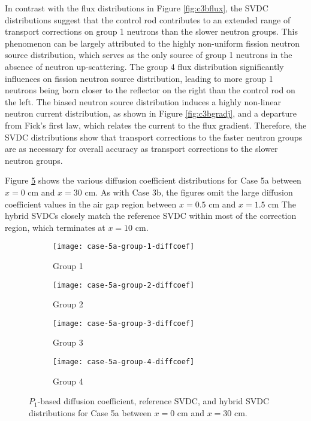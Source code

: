In contrast with the flux distributions in Figure \ref{fig:c3bflux}, the \gls{SVDC} distributions
suggest that the control rod contributes to an extended range of transport corrections on group 1
neutrons than the slower neutron groups. This phenomenon can be largely attributed to the highly
non-uniform fission neutron source distribution, which serves as the only source of group 1
neutrons in the absence of neutron up-scattering. The group 4 flux distribution
significantly influences on fission neutron source distribution, leading to more group 1 neutrons
being born closer to the reflector on the right than the
control rod on the left. The biased neutron source distribution induces a highly non-linear neutron
current distribution, as shown in Figure \ref{fig:c3bgradj}, and a departure from Fick's first law,
which relates the current to the flux gradient. Therefore, the \gls{SVDC} distributions show that
transport corrections to the faster neutron groups are as necessary for overall accuracy as
transport corrections to the slower neutron groups.

Figure \ref{fig:c5adiffcoef} shows the various diffusion coefficient distributions for Case 5a
between $x=0$ cm and $x=30$ cm. As with Case 3b, the figures omit the large diffusion coefficient
values in the air gap region between $x=0.5$ cm and $x=1.5$ cm  The hybrid \glspl{SVDC} closely match
the reference \gls{SVDC} within most of the correction region, which terminates at $x=10$ cm.

\begin{figure}[htb!]
  \centering
  \begin{subfigure}[t]{.49\textwidth}
    \centering
    \texttt{[image: case-5a-group-1-diffcoef]}
    \caption{Group 1}
    \label{fig:c5ag1dc}
  \end{subfigure}
  \hfill
  \begin{subfigure}[t]{.49\textwidth}
    \centering
    \texttt{[image: case-5a-group-2-diffcoef]}
    \caption{Group 2}
    \label{fig:c5ag2dc}
  \end{subfigure}
  \begin{subfigure}[t]{.49\textwidth}
    \centering
    \texttt{[image: case-5a-group-3-diffcoef]}
    \caption{Group 3}
    \label{fig:c5ag3dc}
  \end{subfigure}
  \hfill
  \begin{subfigure}[t]{.49\textwidth}
    \centering
    \texttt{[image: case-5a-group-4-diffcoef]}
    \caption{Group 4}
    \label{fig:c5ag4dc}
  \end{subfigure}
  \caption{$P_1$-based diffusion coefficient, reference \gls{SVDC}, and hybrid \gls{SVDC}
    distributions for Case 5a between $x=0$ cm and $x=30$ cm.}
  \label{fig:c5adiffcoef}
\end{figure}

